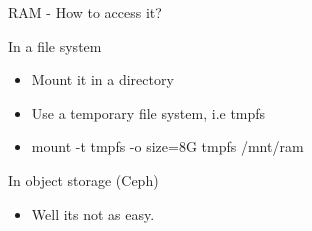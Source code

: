 \begin{frame}{RAM - How to access it?}
    \begin{block}{In a file system}
        \begin{itemize}
            \item Mount it in a directory
            \item Use a temporary file system, i.e tmpfs
            \item mount -t tmpfs -o size=8G tmpfs /mnt/ram
        \end{itemize}
    \end{block}
    \begin{block}{In object storage (Ceph)}
        \begin{itemize}
            \item Well its not as easy. 
        \end{itemize}
    \end{block}
\end{frame}
